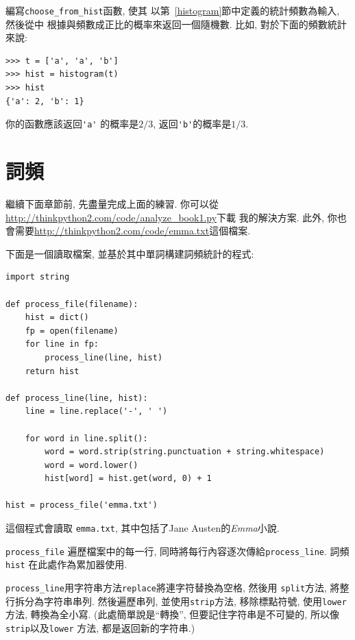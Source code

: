 \documentclass[10pt]{book}
\begin{document}
\begin{exercise}

編寫\verb"choose_from_hist"函數, 使其
以第~\ref{histogram}節中定義的統計頻數為輸入, 然後從中
根據與頻數成正比的概率來返回一個隨機數. 
比如, 對於下面的頻數統計來說:

\begin{verbatim}
>>> t = ['a', 'a', 'b']
>>> hist = histogram(t)
>>> hist
{'a': 2, 'b': 1}
\end{verbatim}
%
你的函數應該返回\verb"'a'" 的概率是$2/3$,  返回\verb"'b'"的概率是$1/3$.
\end{exercise}


\section{詞頻}

繼續下面章節前, 先盡量完成上面的練習. 
你可以從 \url{http://thinkpython2.com/code/analyze_book1.py}下載
我的解決方案. 此外, 你也會需要\url{http://thinkpython2.com/code/emma.txt}這個檔案.

下面是一個讀取檔案, 並基於其中單詞構建詞頻統計的程式:

\begin{verbatim}
import string

def process_file(filename):
    hist = dict()
    fp = open(filename)
    for line in fp:
        process_line(line, hist)
    return hist

def process_line(line, hist):
    line = line.replace('-', ' ')
    
    for word in line.split():
        word = word.strip(string.punctuation + string.whitespace)
        word = word.lower()
        hist[word] = hist.get(word, 0) + 1

hist = process_file('emma.txt')
\end{verbatim}
%
這個程式會讀取 {\tt emma.txt}, 其中包括了Jane Austen的{\em Emma}小說. 

\verb"process_file" 遍歷檔案中的每一行, 同時將每行內容逐次傳給\verb"process_line". 
詞頻{\tt hist} 在此處作為累加器使用. 

\verb"process_line"用字符串方法{\tt replace}將連字符替換為空格, 然後用
 {\tt split}方法, 將整行拆分為字符串串列. 
然後遍歷串列, 並使用{\tt strip}方法, 移除標點符號, 使用{\tt lower}方法, 
轉換為全小寫. (此處簡單說是``轉換'', 但要記住字符串是不可變的, 所以像
{\tt strip}以及{\tt lower} 方法, 都是返回新的字符串.)
\end{document}

